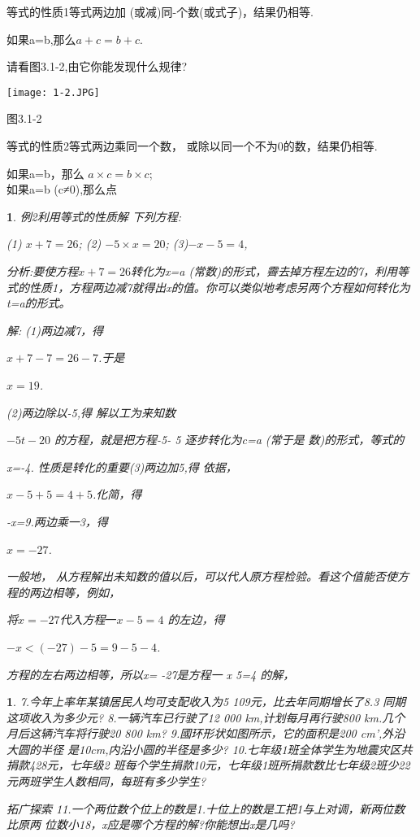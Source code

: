 \documentclass[11pt]{article}
\newtheorem{exercise}{ }
\newtheorem{example}{ }
\begin{document}
等式的性质1等式两边加 (或减)同-个数(或式子)，结果仍相等.

如果a=b,那么$a+c=b+c$.

请看图3.1-2,由它你能发现什么规律?
\begin{center}
  \texttt{[image: 1-2.JPG]}\\
\end{center}
图3.1-2

等式的性质2等式两边乘同一个数， 或除以同一个不为0的数，结果仍相等.

如果a=b，那么 $a \times c=b \times c$;\\

如果a=b (c≠0),那么点

\begin{example}

例2利用等式的性质解 下列方程:

(1) $x+7=26$;  (2) $-5 \times x=20$;  (3)$-x-5=4$,

分析:要使方程$x+7=26$转化为x=a (常数)的形式，霽去掉方程左边的7，利用等式的性质1，方程两边减7就得出x的值。你可以类似地考虑另两个方程如何转化为t=a的形式。

解: (1)两边减7，得

$x+7-7=26-7$.于是

$x=19$.

(2)两边除以-5,得  解以工为来知数

$-5t-20$  的方程，就是把方程-5- 5  逐步转化为c=a (常于是  数)的形式，等式的

x=-4.  性质是转化的重要(3)两边加5,得  依据，

$x-5+5=4+5$.化简，得

-x=9.两边乘一3，得

$x=-27$.

一般地， 从方程解出未知数的值以后，可以代人原方程检验。看这个值能否使方程的两边相等，例如，

将$x=-27$代入方程$一x-5=4$ 的左边，得

$-x<(-27)-5=9-5-4$.

方程的左右两边相等，所以x= -27是方程一 x 5=4 的解，
\end{example}

\begin{exercise}
7.今年上率年某镇居民人均可支配收入为5 109元，比去年同期增长了8.3%
同期这项收入为多少元?
8.一辆汽车已行驶了12 000 km,计划每月再行驶800 km.几个
月后这辆汽车将行驶20 800 km?
9.國环形状如图所示，它的面积是200 cm',外沿大圆的半径
是10cm,内沿小圆的半径是多少?
10.七年级1班全体学生为地震灾区共捐款428元，七年级2
班每个学生捐款10元，七年级1班所捐款数比七年级2班少22元两班学生人数相同，每班有多少学生?

拓广探索
11.一个两位数个位上的数是1.十位上的数是工把1与上对调，新两位数比原两
位数小18，x应是哪个方程的解?你能想出x是几吗?
\end{exercise}
\end{document}
